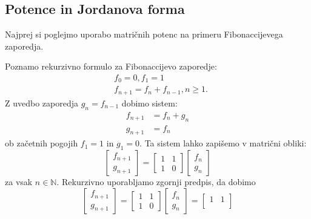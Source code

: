 \documentclass[mat1]{fmfdelo}
\newcommand{\N}{\mathbb N}
\begin{document}
\subsection{Potence in Jordanova forma}
Najprej si poglejmo uporabo matričnih potenc na primeru Fibonaccijevega zaporedja.
\begin{zgled} 
    Poznamo rekurzivno formulo za Fibonaccijevo zaporedje:
    \begin{align*}
        &f_0 = 0, f_1 = 1 \\
        &f_{n+1} = f_n + f_{n-1}, n \geq 1.
    \end{align*}
    Z uvedbo zaporedja $g_n = f_{n-1}$ dobimo sistem:
    \begin{align*}
        f_{n+1} &= f_n + g_n \\
        g_{n+1} &= f_n
    \end{align*}
    ob začetnih pogojih $f_1 = 1$ in $g_1 = 0$. Ta sistem lahko zapišemo v matrični obliki:
    \begin{equation*}
        \begin{bmatrix}
            f_{n+1} \\
            g_{n+1}
        \end{bmatrix}
        =
        \begin{bmatrix}
            1 & 1 \\
            1 & 0
        \end{bmatrix}
        \begin{bmatrix}
            f_n \\
            g_n
        \end{bmatrix}
    \end{equation*}
    za vsak $n \in \N$. Rekurzivno uporabljamo zgornji predpis, da dobimo
    \begin{equation*}
        \begin{bmatrix}
            f_{n+1} \\
            g_{n+1}
        \end{bmatrix}
        =
        \begin{bmatrix}
            1 & 1 \\
            1 & 0
        \end{bmatrix}
        \begin{bmatrix}
            f_n \\
            g_n
        \end{bmatrix}
        =
        \begin{bmatrix}
            1 & 1 \\

\end{bmatrix}
\end{equation*}
\end{zgled}
\end{document}
